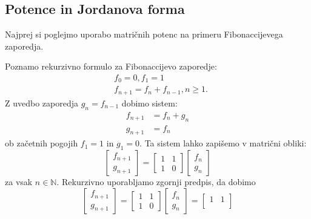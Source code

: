 \documentclass[mat1]{fmfdelo}
\newcommand{\N}{\mathbb N}
\begin{document}
\subsection{Potence in Jordanova forma}
Najprej si poglejmo uporabo matričnih potenc na primeru Fibonaccijevega zaporedja.
\begin{zgled} 
    Poznamo rekurzivno formulo za Fibonaccijevo zaporedje:
    \begin{align*}
        &f_0 = 0, f_1 = 1 \\
        &f_{n+1} = f_n + f_{n-1}, n \geq 1.
    \end{align*}
    Z uvedbo zaporedja $g_n = f_{n-1}$ dobimo sistem:
    \begin{align*}
        f_{n+1} &= f_n + g_n \\
        g_{n+1} &= f_n
    \end{align*}
    ob začetnih pogojih $f_1 = 1$ in $g_1 = 0$. Ta sistem lahko zapišemo v matrični obliki:
    \begin{equation*}
        \begin{bmatrix}
            f_{n+1} \\
            g_{n+1}
        \end{bmatrix}
        =
        \begin{bmatrix}
            1 & 1 \\
            1 & 0
        \end{bmatrix}
        \begin{bmatrix}
            f_n \\
            g_n
        \end{bmatrix}
    \end{equation*}
    za vsak $n \in \N$. Rekurzivno uporabljamo zgornji predpis, da dobimo
    \begin{equation*}
        \begin{bmatrix}
            f_{n+1} \\
            g_{n+1}
        \end{bmatrix}
        =
        \begin{bmatrix}
            1 & 1 \\
            1 & 0
        \end{bmatrix}
        \begin{bmatrix}
            f_n \\
            g_n
        \end{bmatrix}
        =
        \begin{bmatrix}
            1 & 1 \\

\end{bmatrix}
\end{equation*}
\end{zgled}
\end{document}
